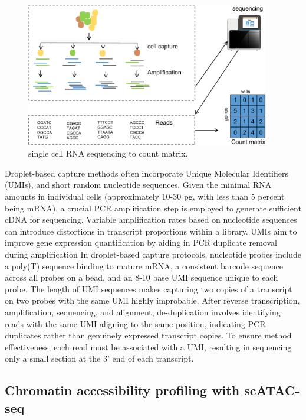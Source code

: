 \begin{figure}[!ht]
	\centering
	\includegraphics[width=0.95\textwidth]{scRNA_to_count_matrix/fig}
	\vspace{0.1cm}
	\caption[single cell RNA sequencing to count matrix.]{single cell RNA sequencing to count matrix.}
	\label{fig:scRNA_to_count_matrix}
\end{figure}

Droplet-based capture methods often incorporate Unique Molecular Identifiers (UMIs), and short random nucleotide sequences. Given the minimal RNA amounts in individual cells (approximately 10-30 pg, with less than 5 percent being mRNA), a crucial PCR amplification step is employed to generate sufficient cDNA for sequencing. Variable amplification rates based on nucleotide sequences can introduce distortions in transcript proportions within a library. UMIs aim to improve gene expression quantification by aiding in PCR duplicate removal during amplification In droplet-based capture protocols, nucleotide probes include a poly(T) sequence binding to mature mRNA, a consistent barcode sequence across all probes on a bead, and an 8-10 base UMI sequence unique to each probe. The length of UMI sequences makes capturing two copies of a transcript on two probes with the same UMI highly improbable. After reverse transcription, amplification, sequencing, and alignment, de-duplication involves identifying reads with the same UMI aligning to the same position, indicating PCR duplicates rather than genuinely expressed transcript copies. To ensure method effectiveness, each read must be associated with a UMI, resulting in sequencing only a small section at the 3' end of each transcript. 


\subsection{Chromatin accessibility profiling with scATAC-seq}
\label{background:sec1:scATAC}

